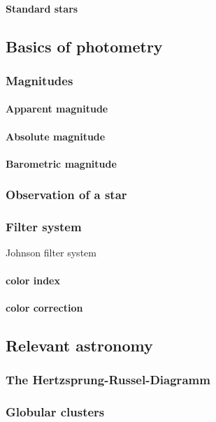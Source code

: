 \paragraph{Standard stars}

\subsection{Basics of photometry} \label{photometry}
\subsubsection{Magnitudes}
\paragraph{Apparent magnitude}
\paragraph{Absolute magnitude}
\paragraph{Barometric magnitude}
\subsubsection{Observation of a star}

\subsubsection{Filter system}
Johnson filter system 
\paragraph{color index}
\paragraph{color correction}

\subsection{Relevant astronomy}
\subsubsection{The Hertzsprung-Russel-Diagramm}
\subsubsection{Globular clusters}